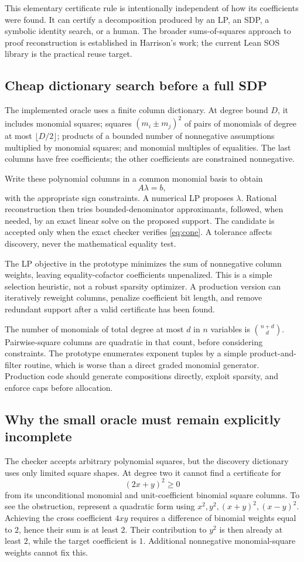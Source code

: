 \documentclass[11pt,letterpaper]{article}
\theoremstyle{definition}\newtheorem{definition}[proposition]{Definition}
\begin{document}
This elementary certificate rule is intentionally independent of how its coefficients were found. It can certify a decomposition produced by an LP, an SDP, a symbolic identity search, or a human. The broader sums-of-squares approach to proof reconstruction is established in Harrison's work; the current Lean SOS library is the practical reuse target.~\cite{harrison,sos}

\subsection{Cheap dictionary search before a full SDP}
The implemented oracle uses a finite column dictionary. At degree bound $D$, it includes monomial squares; squares $(m_i\pm m_j)^2$ of pairs of monomials of degree at most $\lfloor D/2\rfloor$; products of a bounded number of nonnegative assumptions multiplied by monomial squares; and monomial multiples of equalities. The last columns have free coefficients; the other coefficients are constrained nonnegative.

Write these polynomial columns in a common monomial basis to obtain
\[
A\lambda=b,
\]
with the appropriate sign constraints. A numerical LP proposes $\lambda$. Rational reconstruction then tries bounded-denominator approximants, followed, when needed, by an exact linear solve on the proposed support. The candidate is accepted only when the exact checker verifies \eqref{eq:cone}. A tolerance affects discovery, never the mathematical equality test.

The LP objective in the prototype minimizes the sum of nonnegative column weights, leaving equality-cofactor coefficients unpenalized. This is a simple selection heuristic, not a robust sparsity optimizer. A production version can iteratively reweight columns, penalize coefficient bit length, and remove redundant support after a valid certificate has been found.

The number of monomials of total degree at most $d$ in $n$ variables is $\binom{n+d}{d}$. Pairwise-square columns are quadratic in that count, before considering constraints. The prototype enumerates exponent tuples by a simple product-and-filter routine, which is worse than a direct graded monomial generator. Production code should generate compositions directly, exploit sparsity, and enforce caps before allocation.

\subsection{Why the small oracle must remain explicitly incomplete}
The checker accepts arbitrary polynomial squares, but the discovery dictionary uses only limited square shapes. At degree two it cannot find a certificate for
\[
(2x+y)^2\ge0
\]
from its unconditional monomial and unit-coefficient binomial square columns. To see the obstruction, represent a quadratic form using $x^2,y^2,(x+y)^2,(x-y)^2$. Achieving the cross coefficient $4xy$ requires a difference of binomial weights equal to $2$, hence their sum is at least $2$. Their contribution to $y^2$ is then already at least $2$, while the target coefficient is $1$. Additional nonnegative monomial-square weights cannot fix this.
\end{document}
